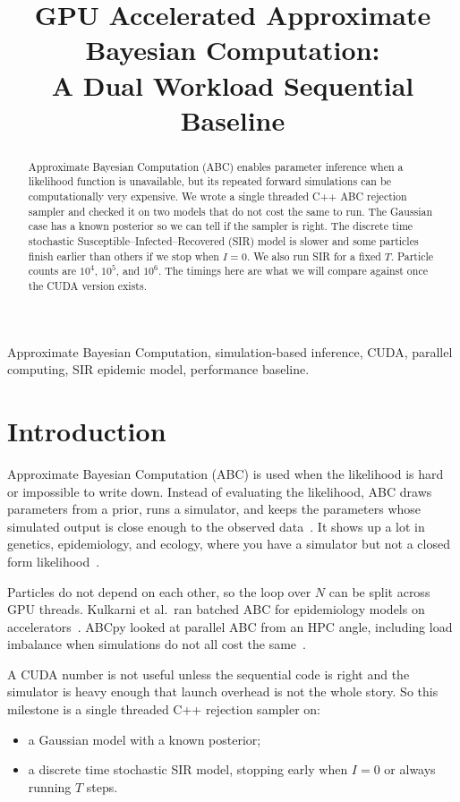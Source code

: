 \documentclass[conference]{IEEEtran}
\title{GPU Accelerated Approximate Bayesian Computation: \\
A Dual Workload Sequential Baseline}
\author{\IEEEauthorblockN{Tejal, Dhyan, Vinay, Arya}
\IEEEauthorblockA{CS F422 Parallel Computing, BITS Goa\\
f20240558@goa.bits-pilani.ac.in}}
\begin{document}
\maketitle

\begin{abstract}
Approximate Bayesian Computation (ABC) enables parameter inference when a
likelihood function is unavailable, but its repeated forward simulations can be
computationally very expensive. We wrote a single threaded C++ ABC rejection
sampler and checked it on two models that do not cost the same to run. The
Gaussian case has a known posterior so we can tell if the sampler is right. The
discrete time stochastic Susceptible--Infected--Recovered (SIR) model is slower
and some particles finish earlier than others if we stop when $I=0$. We also
run SIR for a fixed $T$. Particle counts are $10^4$, $10^5$, and $10^6$. The
timings here are what we will compare against once the CUDA version exists.
\end{abstract}

\begin{IEEEkeywords}
Approximate Bayesian Computation, simulation-based inference, CUDA, parallel
computing, SIR epidemic model, performance baseline.
\end{IEEEkeywords}

\section{Introduction}

Approximate Bayesian Computation (ABC) is used when the likelihood is hard or
impossible to write down. Instead of evaluating the likelihood, ABC draws
parameters from a prior, runs a simulator, and keeps the parameters whose
simulated output is close enough to the observed data~\cite{beaumont2002approximate}.
It shows up a lot in genetics, epidemiology, and ecology, where you have a
simulator but not a closed form likelihood~\cite{sisson2018handbook}.

Particles do not depend on each other, so the loop over $N$ can be split across
GPU threads. Kulkarni et al.\ ran batched ABC for epidemiology models on
accelerators~\cite{kulkarni2022hardware}. ABCpy looked at parallel ABC from an
HPC angle, including load imbalance when simulations do not all cost the
same~\cite{dutta2021abcpy}.

A CUDA number is not useful unless the sequential code is right and the
simulator is heavy enough that launch overhead is not the whole story. So this
milestone is a single threaded C++ rejection sampler on:
\begin{itemize}
    \item a Gaussian model with a known posterior;
    \item a discrete time stochastic SIR model, stopping early when $I=0$ or
          always running $T$ steps.
\end{itemize}
\end{document}
